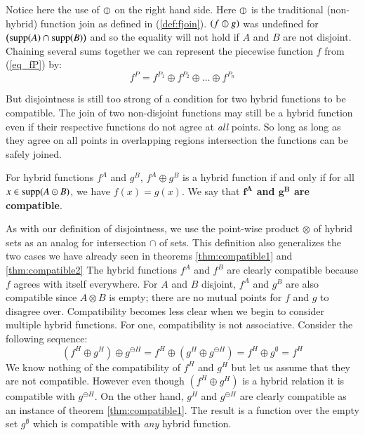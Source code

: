 Notice here the use of $\varobar$ on the right hand side.
Here $\varobar$ is the traditional (non-hybrid) function join as defined in (\ref{def:fjoin}).
$(f \varobar g)$ was undefined for $\left( \text{supp}(A) \cap \text{supp}(B) \right)$ 
and so the equality will not hold if $A$ and $B$ are not disjoint.
Chaining several sums together we can represent the piecewise function $f$ from (\ref{eq_fP}) by:
\begin{equation*}
 	f^P = f^{P_1} \oplus f^{P_2} \oplus \ldots \oplus f^{P_n}
\end{equation*}



But disjointness is still too strong of a condition for two hybrid functions to be compatible.
The join of two non-disjoint functions may still be a hybrid function 
even if their respective functions do not agree at \emph{all} points.
So long as long as they agree on all points in overlapping regions intersection the functions can be safely joined.


\begin{definition}
	For hybrid functions $f^A$ and $g^B$, $f^A \oplus g^B$ is a hybrid function
	if and only if for all $x \in \text{supp} (A \odot B)$, we have $f(x) = g(x)$.
	We say that \textbf{$\boldsymbol{f^A}$ and $\boldsymbol{g^B}$ are compatible}.
\end{definition}


As with our definition of disjointness, we use the point-wise product $\otimes$ 
of hybrid sets as an analog for intersection $\cap$ of sets.
This definition also generalizes the two cases we have already seen in theorems 
\ref{thm:compatible1} and \ref{thm:compatible2}
The hybrid functions $f^A$ and $f^B$ are clearly compatible because $f$ agrees with itself everywhere.
For $A$ and $B$ disjoint, $f^A$ and $g^B$ are also compatible since $A \otimes B$ is empty;
there are no mutual points for $f$ and $g$ to disagree over.
Compatibility becomes less clear when we begin to consider multiple hybrid functions.
For one, compatibility is not associative.
Consider the following sequence:
\begin{equation*}
	(f^H \oplus g^H) \oplus g^{\ominus H} 
	= f^H \oplus (g^H \oplus g^{\ominus H}) 
	= f^H \oplus g^\emptyset = f^H
\end{equation*}
We know nothing of the compatibility of $f^H$ and $g^H$ but let us assume that they are not compatible.
However even though $(f^H \oplus g^H)$ is a hybrid relation it is compatible with $g^{\ominus H}$.
On the other hand, $g^H$ and $g^{\ominus H}$ are clearly compatible as an instance of theorem \ref{thm:compatible1}.
The result is a function over the empty set $g^{\emptyset}$ which is compatible with \emph{any} hybrid function.




